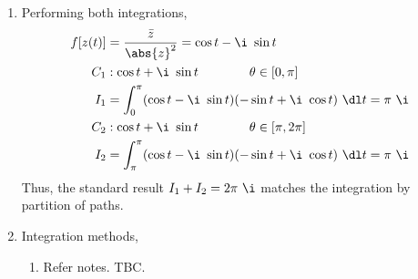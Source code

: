 \begin{enumerate}
    \item Performing both integrations,
          \begin{align}
              f[z(t)] & = \frac{\bar{z}}{\abs{z}^2} = \cos t - \i\ \sin t              \\
              C_1     & : \cos t + \i\ \sin t \qquad\qquad
              \theta \in [0, \pi]                                                      \\
              I_1     & = \int_{0}^{\pi} (\cos t - \i\ \sin t)(-\sin t + \i\ \cos t)
              \ \dl t = \pi\ \i                                                        \\
              C_2     & : \cos t + \i\ \sin t \qquad\qquad
              \theta \in [\pi, 2\pi]                                                   \\
              I_2     & = \int_{\pi}^{\pi} (\cos t - \i\ \sin t)(-\sin t + \i\ \cos t)
              \ \dl t = \pi\ \i
          \end{align}
          Thus, the standard result $ I_1 + I_2 = 2\pi\ \i $ matches the integration by
          partition of paths.

    \item Integration methods,
          \begin{enumerate}
              \item Refer notes. TBC.


\end{enumerate}
\end{enumerate}
